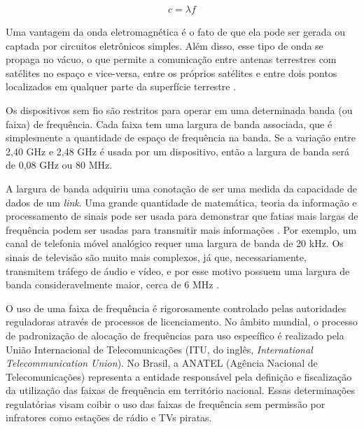 \begin{equation}
	\begin{aligned}
		c = \lambda f
	\end{aligned}
\end{equation}
\begin{figure}[H]
	\centering
\end{figure}

Uma vantagem da onda eletromagnética é o fato de que ela pode ser gerada ou captada por circuitos eletrônicos simples. Além disso, esse tipo de onda se propaga no vácuo, o que permite a comunicação entre antenas terrestres com satélites no espaço e vice-versa, entre os próprios satélites e entre dois pontos localizados em qualquer parte da superfície terrestre \cite{fluminense2010}.

Os dispositivos sem fio são restritos para operar em uma determinada banda (ou faixa) de frequência. Cada faixa tem uma largura de banda associada, que é simplesmente a quantidade de espaço de frequência na banda. Se a variação entre 2,40 GHz e 2,48 GHz é usada por um dispositivo, então a largura de banda será de 0,08 GHz ou 80 MHz.

A largura de banda adquiriu uma conotação de ser uma medida da capacidade de dados de um \textit{link}. Uma grande quantidade de matemática, teoria da informação e processamento de sinais pode ser usada para demonstrar que fatias mais largas de frequência podem ser usadas para transmitir mais informações \cite{gast2002}. Por exemplo, um canal de telefonia móvel analógico requer uma largura de banda de 20 kHz. Os sinais de televisão são muito mais complexos, já que, necessariamente, transmitem tráfego de áudio e vídeo, e por esse motivo possuem uma largura de banda consideravelmente maior, cerca de 6 MHz \cite{gast2002}.

O uso de uma faixa de frequência é rigorosamente controlado pelas autoridades reguladoras através de processos de licenciamento. No âmbito mundial, o processo de padronização de alocação de frequências para uso específico é realizado pela União Internacional de Telecomunicações (ITU, do inglês, \textit{International Telecommunication Union}). No Brasil, a ANATEL (Agência Nacional de Telecomunicações) representa a entidade responsável pela definição e fiscalização da utilização das faixas de frequência em território nacional. Essas determinações regulatórias visam coibir o uso das faixas de frequência sem permissão por infratores como estações de rádio e TVs piratas.

